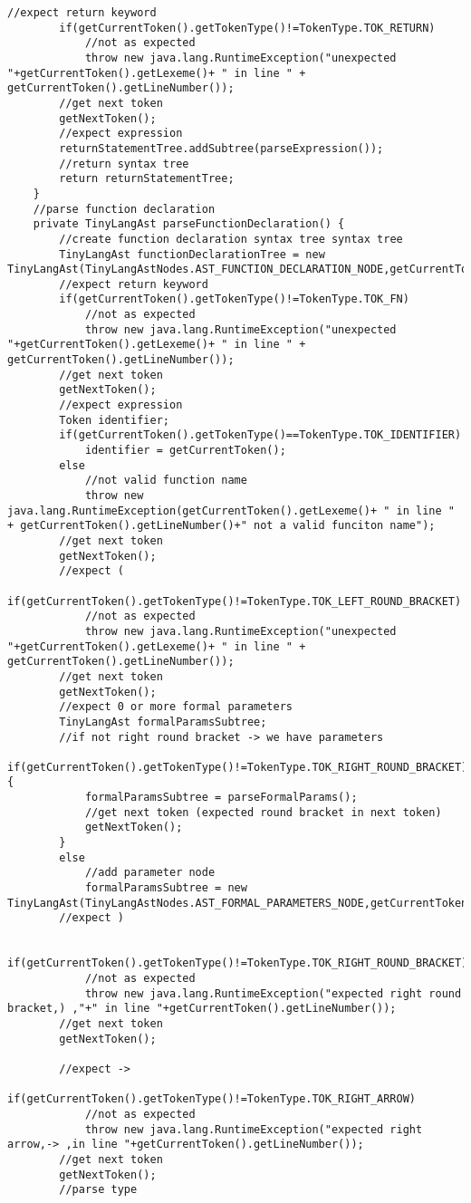 \begin{lstlisting}[basicstyle=\miniscule,caption=Implementation of recursive descent parser,label=listing:rescursive descent parser implementation]
		//expect return keyword
		if(getCurrentToken().getTokenType()!=TokenType.TOK_RETURN)
			//not as expected
			throw new java.lang.RuntimeException("unexpected "+getCurrentToken().getLexeme()+ " in line " + getCurrentToken().getLineNumber());
		//get next token
		getNextToken();
		//expect expression
		returnStatementTree.addSubtree(parseExpression());
		//return syntax tree
		return returnStatementTree;
	}
	//parse function declaration
	private TinyLangAst parseFunctionDeclaration() {
		//create function declaration syntax tree syntax tree
		TinyLangAst functionDeclarationTree = new TinyLangAst(TinyLangAstNodes.AST_FUNCTION_DECLARATION_NODE,getCurrentToken().getLineNumber());
		//expect return keyword
		if(getCurrentToken().getTokenType()!=TokenType.TOK_FN)
			//not as expected
			throw new java.lang.RuntimeException("unexpected "+getCurrentToken().getLexeme()+ " in line " + getCurrentToken().getLineNumber());
		//get next token
		getNextToken();
		//expect expression
		Token identifier;
		if(getCurrentToken().getTokenType()==TokenType.TOK_IDENTIFIER)
			identifier = getCurrentToken();
		else 
			//not valid function name
			throw new java.lang.RuntimeException(getCurrentToken().getLexeme()+ " in line " + getCurrentToken().getLineNumber()+" not a valid funciton name");
		//get next token 
		getNextToken();
		//expect (
		if(getCurrentToken().getTokenType()!=TokenType.TOK_LEFT_ROUND_BRACKET)
			//not as expected
			throw new java.lang.RuntimeException("unexpected "+getCurrentToken().getLexeme()+ " in line " + getCurrentToken().getLineNumber());
		//get next token
		getNextToken();
		//expect 0 or more formal parameters
		TinyLangAst formalParamsSubtree;
		//if not right round bracket -> we have parameters
		if(getCurrentToken().getTokenType()!=TokenType.TOK_RIGHT_ROUND_BRACKET){
			formalParamsSubtree = parseFormalParams();
			//get next token (expected round bracket in next token)
			getNextToken();
		}
		else
			//add parameter node
			formalParamsSubtree = new TinyLangAst(TinyLangAstNodes.AST_FORMAL_PARAMETERS_NODE,getCurrentToken().getLineNumber());
		//expect )

		if(getCurrentToken().getTokenType()!=TokenType.TOK_RIGHT_ROUND_BRACKET)
			//not as expected
			throw new java.lang.RuntimeException("expected right round bracket,) ,"+" in line "+getCurrentToken().getLineNumber());	
		//get next token
		getNextToken();

		//expect ->
		if(getCurrentToken().getTokenType()!=TokenType.TOK_RIGHT_ARROW)
			//not as expected
			throw new java.lang.RuntimeException("expected right arrow,-> ,in line "+getCurrentToken().getLineNumber());
		//get next token
		getNextToken();
		//parse type


\end{lstlisting}
